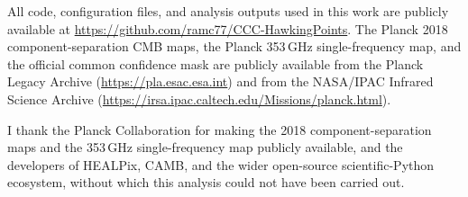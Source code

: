 \documentclass[a4paper,11pt]{article}
\begin{document}
All code, configuration files, and analysis outputs used in this work are publicly available at \url{https://github.com/ramc77/CCC-HawkingPoints}. The Planck 2018 component-separation CMB maps, the Planck 353\,GHz single-frequency map, and the official common confidence mask are publicly available from the Planck Legacy Archive (\url{https://pla.esac.esa.int}) and from the NASA/IPAC Infrared Science Archive (\url{https://irsa.ipac.caltech.edu/Missions/planck.html}).

\acknowledgments

I thank the Planck Collaboration for making the 2018 component-separation maps and the 353\,GHz single-frequency map publicly available, and the developers of HEALPix, CAMB, and the wider open-source scientific-Python ecosystem, without which this analysis could not have been carried out.
\end{document}
